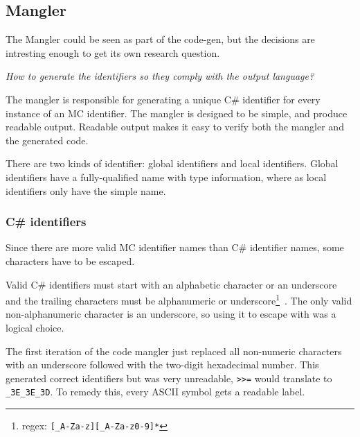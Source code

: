 \subsection{Mangler}
The Mangler could be seen as part of the code-gen, but the decisions are intresting enough to get its own research question.

\textit{How to generate the identifiers so they comply with the output language?}

The mangler is responsible for generating a unique C\# identifier for every instance of an MC identifier.
The mangler is designed to be simple, and produce readable output.
Readable output makes it easy to verify both the mangler and the generated code.

There are two kinds of identifier: global identifiers and local identifiers.
Global identifiers have a fully-qualified name with type information, where as local identifiers only have the simple name.

\subsubsection{C\# identifiers}
Since there are more valid MC identifier names than C\# identifier names, some characters have to be escaped.

Valid C\# identifiers must start with an alphabetic character or an underscore and the trailing characters must be alphanumeric or underscore\footnote{regex: \texttt{[\_A-Za-z][\_A-Za-z0-9]*}}~\cite{msdn_identifiers}.
The only valid non-alphanumeric character is an underscore, so using it to escape with was a logical choice.

The first iteration of the code mangler just replaced all non-numeric characters with an underscore followed with the two-digit hexadecimal number.
This generated correct identifiers but was very unreadable, \verb|>>=| would translate to \verb|_3E_3E_3D|.
To remedy this, every ASCII symbol gets a readable label.


